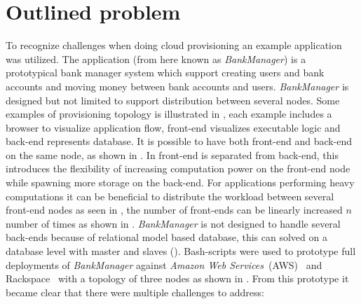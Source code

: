 


\section{Outlined problem}

To recognize challenges when doing cloud provisioning an example application~\cite{BankManager} was utilized.
The application (from here known as \emph{BankManager}) is a prototypical bank manager system
which support creating users and bank accounts and moving money between bank accounts and users.
\emph{BankManager} is designed but not limited to support distribution between several nodes.
Some examples of provisioning topology is illustrated in , each
example includes a browser to visualize application flow, front-end visualizes executable
logic and back-end represents database.
It is possible to have both front-end and back-end on the same node, as shown in .
In  front-end is separated from back-end, 
this introduces the flexibility of increasing computation power on the front-end node while spawning more
storage on the back-end. 
For applications performing heavy computations it can be beneficial to distribute the workload between several
front-end nodes as seen in , the number of front-ends can be linearly increased 
$n$ number of times as shown in .
\emph{BankManager} is not designed to handle several back-ends because of relational model based database,
this can solved on a database level with master and slaves ().
Bash-scripts were used to prototype full deployments of \emph{BankManager} against \emph{Amazon Web Services}~(AWS)~\cite{aws}
and Rackspace~\cite{rackspace} with a topology of three nodes as shown in .
From this prototype it became clear that there were multiple challenges to address:

